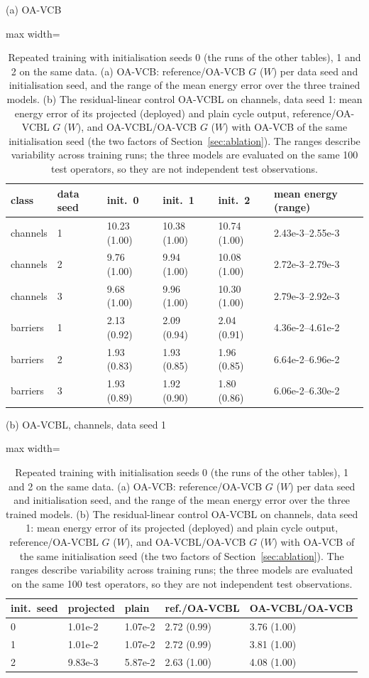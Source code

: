 \begin{table}[tbp]\centering\footnotesize\setlength{\tabcolsep}{4pt}
\caption{Repeated training with initialisation seeds 0 (the runs of the other tables), 1 and 2 on the same data. (a) OA-VCB: reference/OA-VCB $G$ ($W$) per data seed and initialisation seed, and the range of the mean energy error over the three trained models. (b) The residual-linear control OA-VCBL on channels, data seed 1: mean energy error of its projected (deployed) and plain cycle output, reference/OA-VCBL $G$ ($W$), and OA-VCBL/OA-VCB $G$ ($W$) with OA-VCB of the same initialisation seed (the two factors of Section~\ref{sec:ablation}). The ranges describe variability across training runs; the three models are evaluated on the same 100 test operators, so they are not independent test observations.}\label{tab:initseeds}
{\small (a) OA-VCB}\par\smallskip
\begin{adjustbox}{max width=\linewidth}
\begin{tabular}{llllll}\toprule
class & data seed & init.\ 0 & init.\ 1 & init.\ 2 & mean energy (range) \\\midrule
channels & 1 & 10.23 (1.00) & 10.38 (1.00) & 10.74 (1.00) & 2.43e-3--2.55e-3 \\
channels & 2 & 9.76 (1.00) & 9.94 (1.00) & 10.08 (1.00) & 2.72e-3--2.79e-3 \\
channels & 3 & 9.68 (1.00) & 9.96 (1.00) & 10.30 (1.00) & 2.79e-3--2.92e-3 \\
\midrule
barriers & 1 & 2.13 (0.92) & 2.09 (0.94) & 2.04 (0.91) & 4.36e-2--4.61e-2 \\
barriers & 2 & 1.93 (0.83) & 1.93 (0.85) & 1.96 (0.85) & 6.64e-2--6.96e-2 \\
barriers & 3 & 1.93 (0.89) & 1.92 (0.90) & 1.80 (0.86) & 6.06e-2--6.30e-2 \\
\bottomrule\end{tabular}
\end{adjustbox}
\par\medskip
{\small (b) OA-VCBL, channels, data seed 1}\par\smallskip
\begin{adjustbox}{max width=\linewidth}
\begin{tabular}{lllll}\toprule
init.\ seed & projected & plain & ref./OA-VCBL & OA-VCBL/OA-VCB \\\midrule
0 & 1.01e-2 & 1.07e-2 & 2.72 (0.99) & 3.76 (1.00) \\
1 & 1.01e-2 & 1.07e-2 & 2.72 (0.99) & 3.81 (1.00) \\
2 & 9.83e-3 & 5.87e-2 & 2.63 (1.00) & 4.08 (1.00) \\
\bottomrule\end{tabular}
\end{adjustbox}
\end{table}

